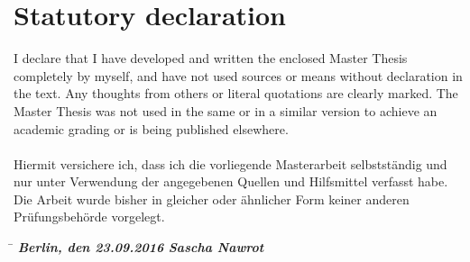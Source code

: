 \chapter*{Statutory declaration}

I declare that I have developed and written the enclosed Master Thesis completely by myself, and have not used sources or means without declaration in the text. Any thoughts from others or literal quotations are clearly marked. The Master Thesis was not used in the same or in a similar version to achieve an academic grading or is being published elsewhere.
\\
\vspace{2cm}
\\
Hiermit versichere ich, dass ich die vorliegende Masterarbeit selbstständig und nur unter Verwendung der angegebenen Quellen und Hilfsmittel verfasst habe. Die Arbeit wurde bisher in gleicher oder ähnlicher Form keiner anderen Prüfungsbehörde vorgelegt.

\vspace{5cm}
\begin{tabbing}
\hspace{6cm}  \= \kill
\textbf{\textit{Berlin, den 23.09.2016} \hspace{5cm} \textit{Sascha Nawrot}}
\end{tabbing}
